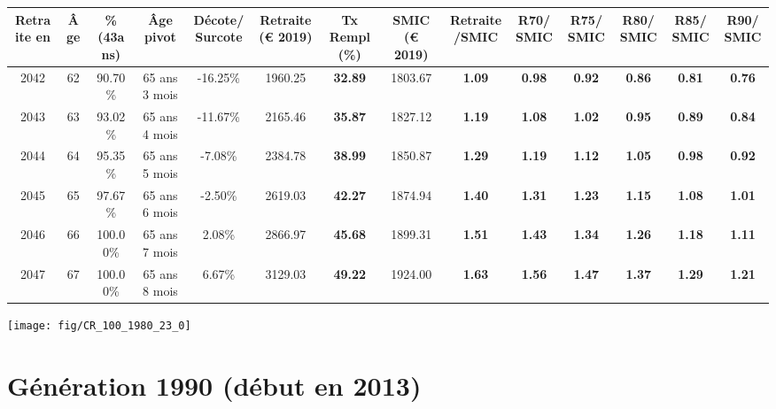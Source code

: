 \begin{adjustbox}{max width=\textwidth} 
\begin{tabular}[htb]{|c|c||c|c|c||c|c||c|c||c|c|c|c|c|} 
\hline 
 Retraite en &  Âge &  \%(43ans) &  Âge pivot &  Décote/Surcote &  Retraite (\euro{} 2019) &  Tx Rempl(\%) &  SMIC (\euro{} 2019) &  Retraite/SMIC &  R70/SMIC &  R75/SMIC &  R80/SMIC &  R85/SMIC &  R90/SMIC \\ 
\hline \hline 
 2042 &  62 &  90.70\% &  65 ans 3 mois &  -16.25\% &  1960.25 &  {\bf 32.89} &  1803.67 &  {\bf 1.09} &  {\bf {\color{red} 0.98}} &  {\bf {\color{red} 0.92}} &  {\bf {\color{red} 0.86}} &  {\bf {\color{red} 0.81}} &  {\bf {\color{red} 0.76}} \\ 
\hline 
 2043 &  63 &  93.02\% &  65 ans 4 mois &  -11.67\% &  2165.46 &  {\bf 35.87} &  1827.12 &  {\bf 1.19} &  {\bf 1.08} &  {\bf 1.02} &  {\bf {\color{red} 0.95}} &  {\bf {\color{red} 0.89}} &  {\bf {\color{red} 0.84}} \\ 
\hline 
 2044 &  64 &  95.35\% &  65 ans 5 mois &  -7.08\% &  2384.78 &  {\bf 38.99} &  1850.87 &  {\bf 1.29} &  {\bf 1.19} &  {\bf 1.12} &  {\bf 1.05} &  {\bf {\color{red} 0.98}} &  {\bf {\color{red} 0.92}} \\ 
\hline 
 2045 &  65 &  97.67\% &  65 ans 6 mois &  -2.50\% &  2619.03 &  {\bf 42.27} &  1874.94 &  {\bf 1.40} &  {\bf 1.31} &  {\bf 1.23} &  {\bf 1.15} &  {\bf 1.08} &  {\bf 1.01} \\ 
\hline 
 2046 &  66 &  100.00\% &  65 ans 7 mois &  2.08\% &  2866.97 &  {\bf 45.68} &  1899.31 &  {\bf 1.51} &  {\bf 1.43} &  {\bf 1.34} &  {\bf 1.26} &  {\bf 1.18} &  {\bf 1.11} \\ 
\hline 
 2047 &  67 &  100.00\% &  65 ans 8 mois &  6.67\% &  3129.03 &  {\bf 49.22} &  1924.00 &  {\bf 1.63} &  {\bf 1.56} &  {\bf 1.47} &  {\bf 1.37} &  {\bf 1.29} &  {\bf 1.21} \\ 
\hline 
\hline 
\end{tabular} 
\end{adjustbox} 
 
 \vspace{0.1cm} 

 {\hspace{-2.2cm}\texttt{[image: fig/CR\_100\_1980\_23\_0]}} 

\newpage 
 
\section{Génération 1990 (début en 2013)\label{CR_100_1990_23_0}} 
 
